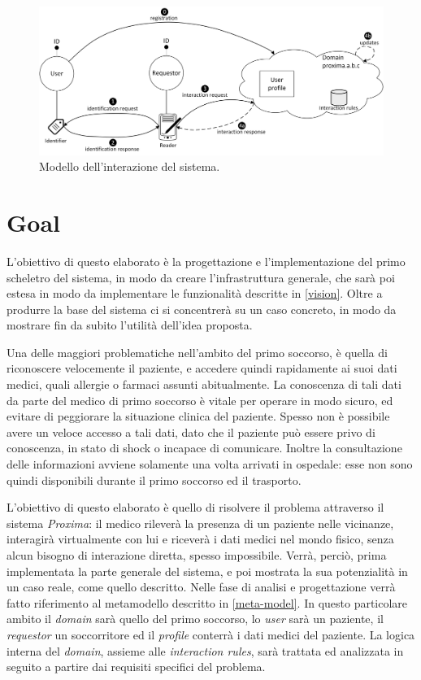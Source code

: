 \documentclass[a4paper,12pt]{report}
\begin{document}
\begin{figure}[H]
	\hspace*{-0.3in}
	\centering
	\includegraphics[width=160mm]{./img/interaction.png}
	\caption{Modello dell'interazione del sistema. \label{interaction-img}}
\end{figure}

\section{Goal} \label{goal}
L'obiettivo di questo elaborato è la progettazione e l'implementazione del primo scheletro del sistema, in modo da creare l'infrastruttura generale, che sarà poi estesa in modo da implementare le funzionalità descritte in \autoref{vision}. Oltre a produrre la base del sistema ci si concentrerà su un caso concreto, in modo da mostrare fin da subito l'utilità dell'idea proposta. 

Una delle maggiori problematiche nell'ambito del primo soccorso, è quella di riconoscere velocemente il paziente, e accedere quindi rapidamente ai suoi dati medici, quali allergie o farmaci assunti abitualmente. La conoscenza di tali dati da parte del medico di primo soccorso è vitale per operare in modo sicuro, ed evitare di peggiorare la situazione clinica del paziente. Spesso non è possibile avere un veloce accesso a tali dati, dato che il paziente può essere privo di conoscenza, in stato di shock o incapace di comunicare. Inoltre la consultazione delle informazioni avviene solamente una volta arrivati in ospedale: esse non sono quindi disponibili durante il primo soccorso ed il trasporto.

L'obiettivo di questo elaborato è quello di risolvere il problema attraverso il sistema \emph{Proxima}: il medico rileverà la presenza di un paziente nelle vicinanze, interagirà virtualmente con lui e riceverà i dati medici nel mondo fisico, senza alcun bisogno di interazione diretta, spesso impossibile. Verrà, perciò, prima implementata la parte generale del sistema, e poi mostrata la sua potenzialità in un caso reale, come quello descritto. Nelle fase di analisi e progettazione verrà fatto riferimento al metamodello descritto in \autoref{meta-model}. In questo particolare ambito il \emph{domain} sarà quello del primo soccorso, lo \emph{user} sarà un paziente, il \emph{requestor} un soccorritore ed il \emph{profile} conterrà i dati medici del paziente. La logica interna del \emph{domain}, assieme alle \emph{interaction rules}, sarà trattata ed analizzata in seguito a partire dai requisiti specifici del problema.  
\end{document}
